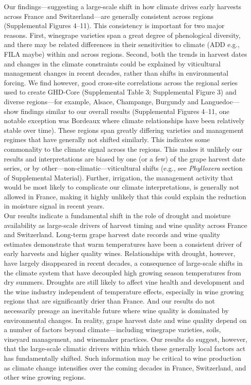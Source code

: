 \documentclass[final]{nature}
\begin{document}
\indent Our findings---suggesting a large-scale shift in how climate drives early harvests across France and Switzerland---are generally consistent across regions (Supplemental Figures 4--11).  This consistency is important for two major reasons. First, winegrape varieties span a great degree of phenological diversity, and there may be related differences in their sensitivities to climate (ADD e.g., FILA maybe) within and across regions\cite{Parker2013}. Second, both the trends in harvest dates and changes in the climate constraints could be explained by viticultural management changes in recent decades, rather than shifts in environmental forcing. We find however, good cross-site correlations across the regional series used to create GHD-Core (Supplemental Table 3; Supplemental Figure 3) and diverse regions---for example, Alsace, Champange, Burgundy and Languedoc---show findings similar to our overall results (Supplemental Figures 4--11, one notable exception was Bordeaux where climate relationships have been relatively stable over time). These regions span greatly differing varieties and management regimes that have generally not shifted similarly. This indicates some commonality to the climate signal across the regions. This makes it unlikely our results and interpretations are biased by one (or a few) of the grape harvest date series, or by other---non-climatic---viticultural shifts (e.g., see \emph{Phylloxera} section of Supplemental Material). Further, irrigation, the management activity that would be most likely to complicate our climate interpretations, is generally not allowed in France, making it highly unlikely that this could explain the reduction in moisture signal in recent years.\\
\indent Our results indicate a fundamental shift in the role of drought and moisture availability as large-scale drivers of harvest timing and wine quality across France and Switzerland. Long-term grape harvest date records and wine quality estimates demonstrate that warm temperatures have been a consistent driver of early harvests and higher quality wines. Relationships with drought, however, have largely disappeared in recent decades, a consequence of large-scale shifts in the climate system that have decoupled high growing season temperatures from dry summers. Droughts are still likely to affect vine health and development and the wine industry independent of temperature effects, especially in wine growing regions that are significantly drier than France\cite{VanLeeuwen2015,webb2012}. And our results do not necessarily presage an inevitable future where wine quality is dominated by environmental changes. In reality, grape harvest date and wine quality depend on a number of factors beyond climate---including winegrape varieties, soils, vineyard management, and winemaker practices\cite{Jackson1993,Leeuwen2013}. Our results do suggest, however, that the large-scale climatic drivers within which these generally local factors act has fundamentally shifted. Such information may be critical to wine production as climate change intensifies over the coming decades in France, Switzerland, and other wine growing regions.
\end{document}
